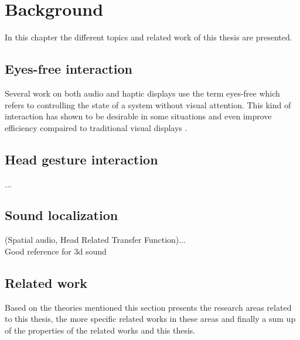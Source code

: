 \chapter{Background}
In this chapter the different topics and related work of this thesis are presented.

\section{Eyes-free interaction}
Several work on both audio \cite{kajastila_eyes-free_2013,bonner_no-look_2010,brewster_multimodaleyes-freeinteraction_2003,zhao_earpod:_2007,vazquez-alvarez_eyes-free_2011} and haptic \cite{pasquero_haptic_2011,pielot_tactile_2011} displays use the term eyes-free which refers to controlling the state of a system without visual attention. This kind of interaction has shown to be desirable in some situations \cite{oakley_designing_2007,yi_exploring_2012} and even improve efficiency compaired to traditional visual displays \cite{zhao_earpod:_2007}.


\section{Head gesture interaction}
...

\section{Sound localization}
(Spatial audio, Head Related Transfer Function)...\\
Good reference for 3d sound \cite{begault_3dd_1994}

\section{Related work}
Based on the theories mentioned this section presents the research areas related to this thesis, the more specific related works in these areas and finally a sum up of the properties of the related works and this thesis.

